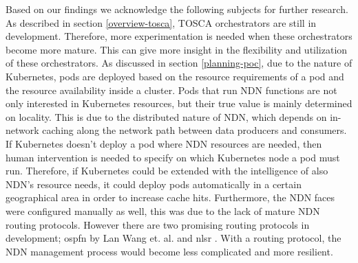 

Based on our findings we acknowledge the following subjects for further research. As described in section \ref{overview-tosca}, TOSCA orchestrators are still in development. Therefore, more experimentation is needed when these orchestrators become more mature. This can give more insight in the flexibility and utilization of these orchestrators. As discussed in section \ref{planning-poc}, due to the nature of Kubernetes, pods are deployed based on the resource requirements of a pod and the resource availability inside a cluster. Pods that run NDN functions are not only interested in Kubernetes resources, but their true value is mainly determined on locality. This is due to the distributed nature of NDN, which depends on in-network caching along the network path between data producers and consumers. If Kubernetes doesn't deploy a pod where NDN resources are needed, then human intervention is needed to specify on which Kubernetes node a pod must run. Therefore, if Kubernetes could be extended with the intelligence of also NDN's resource needs, it could deploy pods automatically in a certain geographical area in order to increase cache hits. Furthermore, the NDN faces were configured manually as well, this was due to the lack of mature NDN routing protocols. However there are two promising routing protocols in development; \gls{ospfn} by Lan Wang et. al. \cite{ndn-ospfn1, ndn-ospfn2} and \gls{nlsr} \cite{nlsr}. With a routing protocol, the NDN management process would become less complicated and more resilient.

